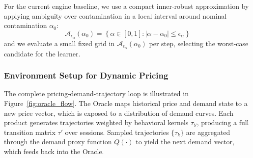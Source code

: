 For the current engine baseline, we use a compact inner-robust approximation by applying ambiguity over contamination in a local interval around nominal contamination $\alpha_0$:
\begin{equation}
\mathcal{A}_{\epsilon_\alpha}(\alpha_0)=\left\{\alpha\in[0,1]:\lvert\alpha-\alpha_0\rvert\le\epsilon_\alpha\right\}
\end{equation}
and we evaluate a small fixed grid in $\mathcal{A}_{\epsilon_\alpha}(\alpha_0)$ per step, selecting the worst-case candidate for the learner.


\subsubsection{Environment Setup for Dynamic Pricing}
The complete pricing-demand-trajectory loop is illustrated in Figure~\ref{fig:oracle_flow}. The Oracle maps historical price and demand state to a new price vector, which is exposed to a distribution of demand curves. Each product generates trajectories weighted by behavioral kernels $\tau_Y$, producing a full transition matrix $\tau'$ over sessions. Sampled trajectories $\{\tau_k\}$ are aggregated through the demand proxy function $Q(\cdot)$ to yield the next demand vector, which feeds back into the Oracle.

